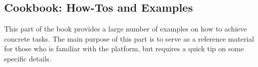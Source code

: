 \begin{partbacktext}
\part{Cookbook: How-Tos and Examples}\label{part-III}
  This part of the book provides a large number of examples on how to achieve concrete tasks.
  The main purpose of this part is to serve as a reference material for those who is familiar with the platform, but requires a quick tip on some specific details.
\end{partbacktext}
